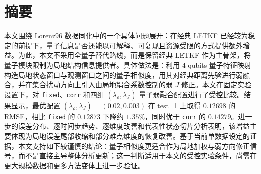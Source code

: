 \section*{摘要}
本文围绕 Lorenz96 数据同化中的一个具体问题展开：在经典 LETKF 已经较为稳定的前提下，量子信息是否还能以可解释、可复现且资源受限的方式提供额外增益。为此，本文不采用全量子替代路线，而是保留经典 LETKF 作为主骨架，将量子模块限制为局地结构信息提供者。具体做法是：利用 $4$ qubits 量子特征映射构造局地状态窗口与观测窗口之间的量子相似度，用其对经典距离先验进行弱融合，并在集合扰动方向上引入由局地耦合系数控制的弱 $J$ 修正。本文在固定实验设置下，对 \texttt{fixed}、\texttt{corr} 和四组 $(\lambda_\rho,\lambda_J)$ 量子弱融合配置进行了受控比较。结果显示，最优配置 $(\lambda_\rho,\lambda_J)=(0.02,0.003)$ 在 test\_1 上取得 $0.12698$ 的 RMSE，相比 \texttt{fixed} 的 $0.12873$ 下降约 $1.35\%$，同时优于 \texttt{corr} 的 $0.14279$。进一步的误差分布、逐时间步趋势、逐维度改善和代表性状态切片分析表明，该增益主要体现为局地误差尾部收缩和部分难点维度的恢复改善。基于当前单数据设定的证据，本文支持如下较谨慎的结论：量子相似度更适合作为局地加权与弱方向修正信号，而不是直接主导整体分析更新；这一判断适用于本文的受控实验条件，尚需在更大规模数据和更多方法变体上进一步验证。
